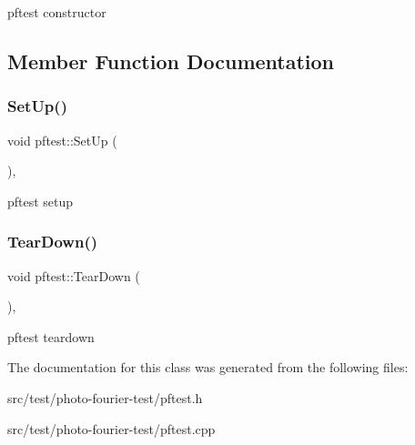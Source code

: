 pftest constructor 

\subsection{Member Function Documentation}
\mbox{\label{classpftest_ae22f0b960c3e3814bef9e84eac73130f}} 
\subsubsection{\texorpdfstring{Set\+Up()}{SetUp()}}
{\footnotesize\ttfamily void pftest\+::\+Set\+Up (\begin{DoxyParamCaption}{ }\end{DoxyParamCaption})\hspace{0.3cm}{\ttfamily [protected]}, {\ttfamily [virtual]}}

pftest setup \mbox{\label{classpftest_a9cf3baf9ba834e229c0b47d83c48167f}} 
\subsubsection{\texorpdfstring{Tear\+Down()}{TearDown()}}
{\footnotesize\ttfamily void pftest\+::\+Tear\+Down (\begin{DoxyParamCaption}{ }\end{DoxyParamCaption})\hspace{0.3cm}{\ttfamily [protected]}, {\ttfamily [virtual]}}

pftest teardown 

The documentation for this class was generated from the following files\+:\begin{DoxyCompactItemize}
\item 
src/test/photo-\/fourier-\/test/pftest.\+h\item 
src/test/photo-\/fourier-\/test/pftest.\+cpp\end{DoxyCompactItemize}
